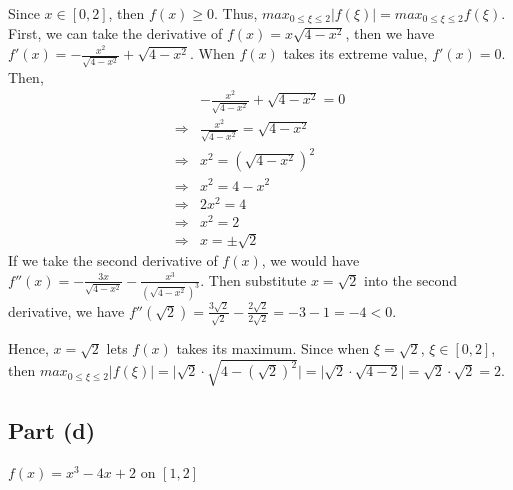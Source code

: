 \begin{answer}
    Since $x \in [0,2]$, then $f(x) \geq 0$. Thus, $max_{0 \leq \xi \leq 2}{\lvert f(\xi) \rvert} = max_{0 \leq \xi \leq 2}{f(\xi)}$.
    First, we can take the derivative of $f(x) = x\sqrt{4 - x^2}$, then we have $f'(x) = -\tfrac{x^2}{\sqrt{4-x^2}} + \sqrt{4-x^2}$. When $f(x)$ takes its extreme value, $f'(x) = 0$. Then,
    \begin{align}
        & -\tfrac{x^2}{\sqrt{4-x^2}} + \sqrt{4-x^2} = 0\\
        \Rightarrow & \tfrac{x^2}{\sqrt{4-x^2}} = \sqrt{4-x^2}\\
        \Rightarrow & x^2 = {\left(\sqrt{4-x^2}\right)}^2\\
        \Rightarrow & x^2 = 4 - x^2\\
        \Rightarrow & 2x^2 = 4\\
        \Rightarrow & x^2 = 2\\
        \Rightarrow & x = \pm \sqrt{2}
    \end{align}
    If we take the second derivative of $f(x)$, we would have $f''(x) = -\tfrac{3x}{\sqrt{4-x^2}}-\tfrac{x^3}{\left(\sqrt{4-x^2}\right)^{3}}$. Then substitute $x = \sqrt{2}$ into the second derivative, we have $f''(\sqrt{2}) = \tfrac{3\sqrt{2}}{\sqrt{2}} - \tfrac{2\sqrt{2}}{2\sqrt{2}} = -3 - 1 = -4 < 0$.
    
    Hence, $x = \sqrt{2}$ lets $f(x)$ takes its maximum. Since when $\xi = \sqrt{2}$, $\xi \in [0,2]$, then $max_{0 \leq \xi \leq 2}{\lvert f(\xi) \rvert} = \lvert \sqrt{2}\cdot\sqrt{4 - {(\sqrt{2})}^2} \rvert = \lvert \sqrt{2}\cdot\sqrt{4-2} \rvert = \sqrt{2}\cdot\sqrt{2} = 2$.
\end{answer}

\subsection{Part (d)}

\begin{question}
\begin{center}
    $f(x) = x^3 −4x + 2$ on $[1,2]$
\end{center}
\end{question}

